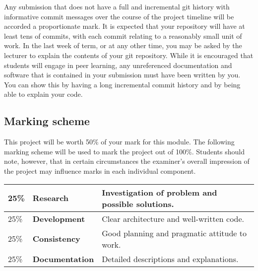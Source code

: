 \documentclass[12pt, a4paper]{article}
\begin{document}
Any submission that does not have a full and incremental git history with informative commit messages over the course of the project timeline will be accorded a proportionate mark.
It is expected that your repository will have at least tens of commits, with each commit relating to a reasonably small unit of work.
In the last week of term, or at any other time, you may be asked by the lecturer to explain the contents of your git repository.
While it is encouraged that students will engage in peer learning, any unreferenced documentation and software that is contained in your submission must have been written by you.
You can show this by having a long incremental commit history and by being able to explain your code.

\subsection*{Marking scheme}
This project will be worth 50\% of your mark for this module.
The following marking scheme will be used to mark the project out of 100\%.
Students should note, however, that in certain circumstances the examiner's overall impression of the project may influence marks in each individual component.

\begin{center}
  \begin{tabular}{llp{8.4cm}}
    \toprule
    25\% & \textbf{Research} & Investigation of problem and possible solutions. \\
    \midrule
    25\% & \textbf{Development} & Clear architecture and well-written code. \\
    \midrule
    25\% & \textbf{Consistency} & Good planning and pragmatic attitude to work. \\
    \midrule
    25\% & \textbf{Documentation} & Detailed descriptions and explanations. \\
    \bottomrule
  \end{tabular}
\end{center}
\end{document}
